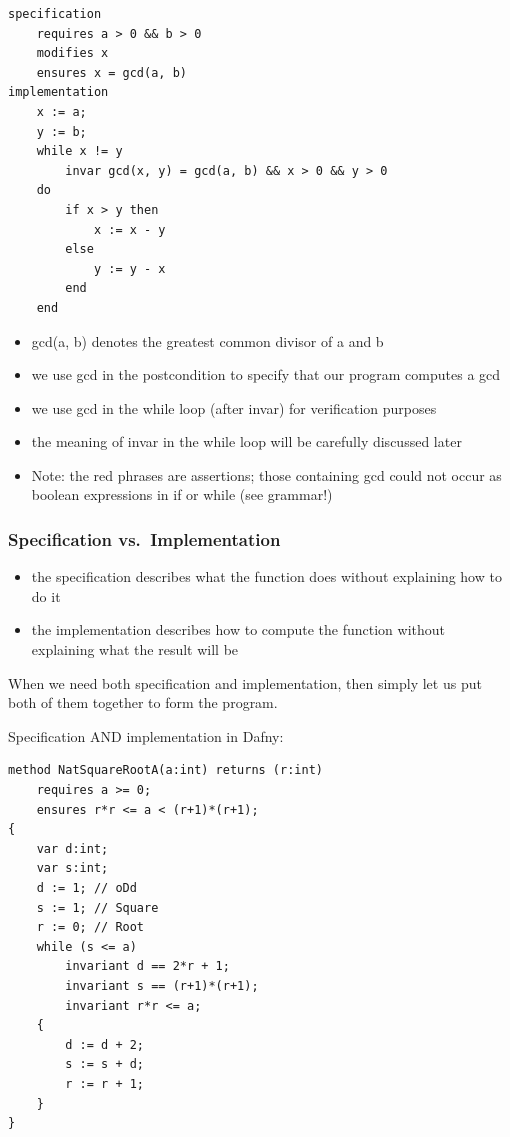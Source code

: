 \begin{lstlisting}
specification
    requires a > 0 && b > 0
    modifies x
    ensures x = gcd(a, b)
implementation
    x := a;
    y := b;
    while x != y
        invar gcd(x, y) = gcd(a, b) && x > 0 && y > 0
    do
        if x > y then
            x := x - y
        else
            y := y - x
        end
    end
\end{lstlisting}

\begin{itemize}
\tightlist
\item
  gcd(a, b) denotes the greatest common divisor of a and b
\item
  we use gcd in the postcondition to specify that our program computes a
  gcd
\item
  we use gcd in the while loop (after invar) for verification purposes
\item
  the meaning of invar in the while loop will be carefully discussed
  later
\item
  Note: the red phrases are assertions; those containing gcd could not
  occur as boolean expressions in if or while (see grammar!)
\end{itemize}

\clearpage
\hypertarget{specification-vs.implementation}{%
\subsubsection{Specification
vs.~Implementation}\label{specification-vs.implementation}}

\begin{itemize}
\tightlist
\item
  the specification describes what the function does without explaining
  how to do it
\item
  the implementation describes how to compute the function without
  explaining what the result will be
\end{itemize}

When we need both specification and implementation, then simply let us
put both of them together to form the program.

Specification AND implementation in Dafny:

\begin{lstlisting}
method NatSquareRootA(a:int) returns (r:int)
    requires a >= 0;
    ensures r*r <= a < (r+1)*(r+1);
{
    var d:int;
    var s:int;
    d := 1; // oDd
    s := 1; // Square
    r := 0; // Root
    while (s <= a)
        invariant d == 2*r + 1;
        invariant s == (r+1)*(r+1);
        invariant r*r <= a;
    {
        d := d + 2;
        s := s + d;
        r := r + 1;
    }
}
\end{lstlisting}

